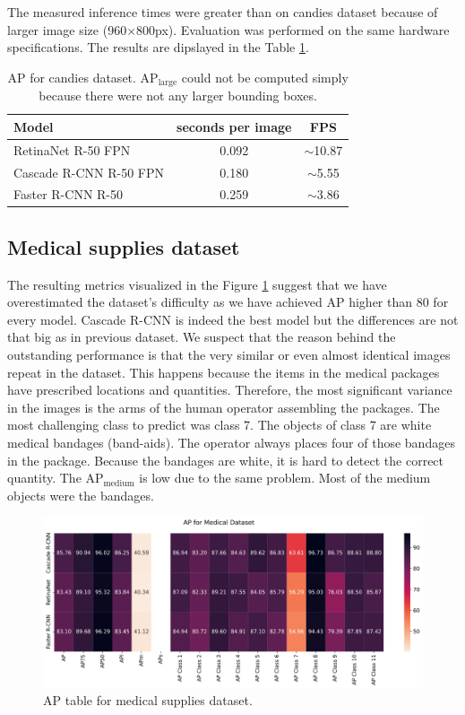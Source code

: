 The measured inference times were greater than on candies dataset because of
larger image size (960$\times$800px). Evaluation was performed on the same
hardware specifications. The results are dipslayed in the Table
\ref{tab:metal_time}.

\begin{table}[H]
	\centering
	\small
	\begin{tabular}{l|c|c}
		Model                  & seconds per image & FPS                                \\
		\hline
		RetinaNet R-50 FPN     & 0.092             & \scriptsize $\sim$\normalsize10.87 \\
		Cascade R-CNN R-50 FPN & 0.180             & \scriptsize $\sim$\normalsize5.55  \\
		Faster R-CNN R-50      & 0.259             & \scriptsize $\sim$\normalsize3.86  \\
	\end{tabular}
	\normalsize
	\caption{AP for candies dataset. AP$_\text{large}$ could not be computed
		simply because there were not any larger bounding boxes.}
	\label{tab:metal_time}
\end{table}

\subsection*{Medical supplies dataset}
The resulting metrics visualized in the Figure \ref{fig:medical_ap} suggest that
we have overestimated the dataset's difficulty as we have achieved AP higher
than 80 for every model. Cascade R-CNN is indeed the best model but the
differences are not that big as in previous dataset. We suspect that the reason
behind the outstanding performance is that the very similar or even almost
identical images repeat in the dataset. This happens because the items in the
medical packages have prescribed locations and quantities. Therefore, the most
significant variance in the images is the arms of the human operator assembling
the packages. The most challenging class to predict was class 7.  The objects of
class 7 are white medical bandages (band-aids). The operator always places four
of those bandages in the package. Because the bandages are white, it is hard to
detect the correct quantity. The AP$_{\text{medium}}$ is low due to the same
problem. Most of the medium objects were the bandages.

\begin{figure}[H]
	\includegraphics[width=\linewidth]{Sources/Figures/medical/medical_ap.png}
	\caption{AP table for medical supplies dataset.}
	\label{fig:medical_ap}
\end{figure}

